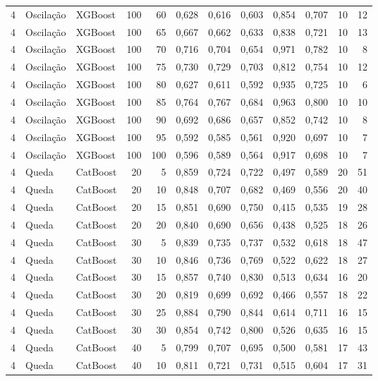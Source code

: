 \begin{longtable}{@{}rllrrrrrrrrr@{}}
4 & Oscilação & XGBoost & 100 & 60 & 0,628 & 0,616 & 0,603 & 0,854 & 0,707 & 10 & 12 \\
4 & Oscilação & XGBoost & 100 & 65 & 0,667 & 0,662 & 0,633 & 0,838 & 0,721 & 10 & 13 \\
4 & Oscilação & XGBoost & 100 & 70 & 0,716 & 0,704 & 0,654 & 0,971 & 0,782 & 10 & 8 \\
4 & Oscilação & XGBoost & 100 & 75 & 0,730 & 0,729 & 0,703 & 0,812 & 0,754 & 10 & 12 \\
4 & Oscilação & XGBoost & 100 & 80 & 0,627 & 0,611 & 0,592 & 0,935 & 0,725 & 10 & 6 \\
4 & Oscilação & XGBoost & 100 & 85 & 0,764 & 0,767 & 0,684 & 0,963 & 0,800 & 10 & 10 \\
4 & Oscilação & XGBoost & 100 & 90 & 0,692 & 0,686 & 0,657 & 0,852 & 0,742 & 10 & 8 \\
4 & Oscilação & XGBoost & 100 & 95 & 0,592 & 0,585 & 0,561 & 0,920 & 0,697 & 10 & 7 \\
4 & Oscilação & XGBoost & 100 & 100 & 0,596 & 0,589 & 0,564 & 0,917 & 0,698 & 10 & 7 \\
4 & Queda & CatBoost & 20 & 5 & 0,859 & 0,724 & 0,722 & 0,497 & 0,589 & 20 & 51 \\
4 & Queda & CatBoost & 20 & 10 & 0,848 & 0,707 & 0,682 & 0,469 & 0,556 & 20 & 40 \\
4 & Queda & CatBoost & 20 & 15 & 0,851 & 0,690 & 0,750 & 0,415 & 0,535 & 19 & 28 \\
4 & Queda & CatBoost & 20 & 20 & 0,840 & 0,690 & 0,656 & 0,438 & 0,525 & 18 & 26 \\
4 & Queda & CatBoost & 30 & 5 & 0,839 & 0,735 & 0,737 & 0,532 & 0,618 & 18 & 47 \\
4 & Queda & CatBoost & 30 & 10 & 0,846 & 0,736 & 0,769 & 0,522 & 0,622 & 18 & 27 \\
4 & Queda & CatBoost & 30 & 15 & 0,857 & 0,740 & 0,830 & 0,513 & 0,634 & 16 & 20 \\
4 & Queda & CatBoost & 30 & 20 & 0,819 & 0,699 & 0,692 & 0,466 & 0,557 & 18 & 22 \\
4 & Queda & CatBoost & 30 & 25 & 0,884 & 0,790 & 0,844 & 0,614 & 0,711 & 16 & 15 \\
4 & Queda & CatBoost & 30 & 30 & 0,854 & 0,742 & 0,800 & 0,526 & 0,635 & 16 & 15 \\
4 & Queda & CatBoost & 40 & 5 & 0,799 & 0,707 & 0,695 & 0,500 & 0,581 & 17 & 43 \\
4 & Queda & CatBoost & 40 & 10 & 0,811 & 0,721 & 0,731 & 0,515 & 0,604 & 17 & 31 \\

\end{longtable}
